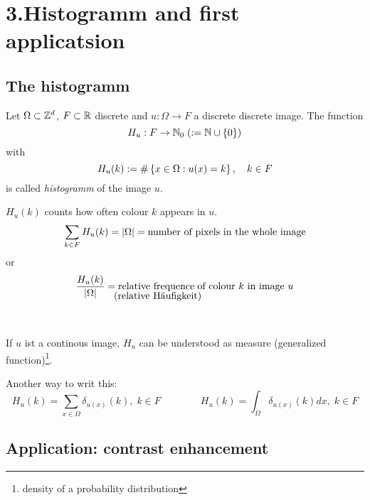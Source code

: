 \chapter{3.Histogramm and first applicatsion}
\section{The histogramm}
%
%
\begin{definition}[histogram]
	Let $\Omega \subset \mathbb{Z}^d$, $F\subset \mathbb{R}$ discrete and 
 	$u: \Omega \to F$ a discrete discrete image. 
 	The function 
 		$$ H_u : F \to \mathbb{N}_0 \; (:= \mathbb{N} \cup \left\{0\right\})$$
 	with 
	$$ H_u (k) := \# \left\{ x\in \Omega: 
		u(x) = k\right\}, \quad k\in F$$
	is called \emph{histogramm} of the image $u$.
\end{definition}

%
%
$H_u(k)$ counts how often colour $k$ appears in $u$.
%
	$$ \sum_{k\in F} H_u (k) = |\Omega| 
		= \hbox{number of pixels in the whole  image}$$
or
%
	$$ {H_u(k) \over |\Omega|} = 
		\hbox{relative frequence$%
			_{\lower0.84em\hbox{\hskip-8.1em (relative Häufigkeit)}}$ 
				 \hskip-.8em \hbox{of colour $k$ in image $u$}} $$

\begin{bsp}\ 
	\HistogrammEx
\end{bsp}

If $u$ ist a continous image, $H_u$ can be understood as
measure (generalized function)\footnote{density
of a probability distribution}. 

\newcommand{\underarrow}[2]{%
	\newlength{\widthA}
	\newlength{\widthB}
	\settowidth{\widthA}{#1}
	\settowidth{\widthB}{#2}
	\vbox{1\widthA}{#1\\ \hskip-2em\parbox{\widthB}{$\uparrow$\\#2}}
}
{\small 
	Another way to writ this:
	\[ H_u(k) = \sum_{x\in \Omega} 
	\delta _{u(x)}(k),\;
		k \in F \qquad \qquad
		H_u (k) = \int_{\Omega} \delta_{u(x)}(k) dx, \;
		k\in F\]
}


\section{Application: contrast enhancement}

